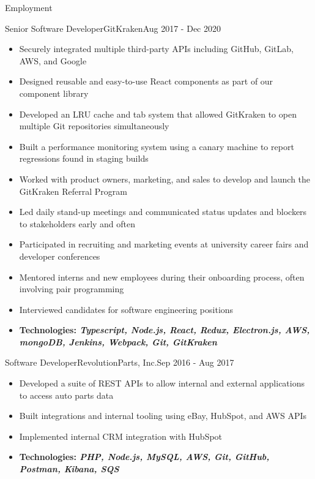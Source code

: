 \documentclass[]{mcdowellcv}
\begin{document}
	\makeheader

	\begin{cvsection}{Employment}
		\begin{cvsubsection}{Senior Software Developer}{GitKraken}{Aug 2017 - Dec 2020}
			\begin{itemize}
				\item Securely integrated multiple third-party APIs including GitHub, GitLab, AWS, and Google
				\item Designed reusable and easy-to-use React components as part of our component library
				\item Developed an LRU cache and tab system that allowed GitKraken to open multiple Git repositories simultaneously
				\item Built a performance monitoring system using a canary machine to report regressions found in staging builds
				\item Worked with product owners, marketing, and sales to develop and launch the GitKraken Referral Program
				\item Led daily stand-up meetings and communicated status updates and blockers to stakeholders early and often
				\item Participated in recruiting and marketing events at university career fairs and developer conferences
				\item Mentored interns and new employees during their onboarding process, often involving pair programming
				\item Interviewed candidates for software engineering positions
				\item \textbf{Technologies: \emph{Typescript, Node.js, React, Redux, Electron.js, AWS, mongoDB, Jenkins, Webpack, Git, GitKraken}}
			\end{itemize}
		\end{cvsubsection}

		\begin{cvsubsection}{Software Developer}{RevolutionParts, Inc.}{Sep 2016 - Aug 2017}
			\begin{itemize}
				\item Developed a suite of REST APIs to allow internal and external applications to access auto parts data
				\item Built integrations and internal tooling using eBay, HubSpot, and AWS APIs
				\item Implemented internal CRM integration with HubSpot
				\item \textbf{Technologies: \emph{PHP, Node.js, MySQL, AWS, Git, GitHub, Postman, Kibana, SQS}}
			\end{itemize}
		\end{cvsubsection}


\end{cvsection}
\end{document}
